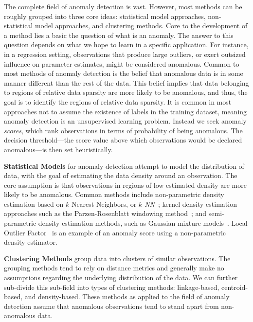 
The complete field of anomaly detection is vast.  However, most methods can be 
    roughly grouped into three core ideas: statistical model approaches, 
    non-statistical model approaches, and clustering methods. Core to the 
    development of a method lies a basic the question of what is an anomaly.  
    The answer to this question depends on what we hope to
    learn in a specific application.  For instance, in a regression setting, 
    observations that produce large outliers, or exert outsized influence on 
    parameter estimates, might be considered anomalous.  Common to most 
    methods of anomaly detection is the belief that anomalous data is in some 
    manner different than the rest of the data. This belief implies that data 
    belonging to regions of relative data sparsity are more likely to be 
    anomalous, and thus, the goal is to identify the regions of relative 
    data sparsity. It is common in most approaches not to assume the existence 
    of labels in the training dataset, meaning anomaly detection is an 
    unsupervised learning problem.  Instead we seek anomaly \emph{scores}, 
    which rank observations in terms of probability of being anomalous.  The 
    decision threshold---the score value above which observations would be 
    declared anomalous---is then set heuristically.
    

{\bf Statistical Models} for anomaly detection attempt to model the distribution 
    of data, with the goal of estimating the data density around an observation. 
    The core assumption is that observations in regions of low estimated density 
    are more likely to be anomalous.  Common methods include non-parametric 
    density estimation based on $k$-Nearest Neighbors, or 
    \emph{$k$-NN}~\citep{kramer2013}; kernel density estimation approaches such 
    as the Parzen-Rosenblatt windowing method~\citep{parzen1962,rosenblatt1956}; 
    and semi-parametric density estimation methods, such as Gaussian mixture 
    models~\citep{mcnicholas2010}.  Local Outlier Factor~\cite{breunig2000} is 
    an example of an anomaly score using a non-parametric density estimator.

{\bf Clustering Methods} group data into clusters of similar observations.
    The grouping methods tend to rely on distance metrics and generally make no 
    assumptions regarding the underlying distribution of the data.  We can 
    further sub-divide this sub-field into types of clustering methods: 
    linkage-based, centroid-based, and density-based. These methods as applied 
    to the field of anomaly detection assume that anomalous observations tend 
    to stand apart from non-anomalous data.  

